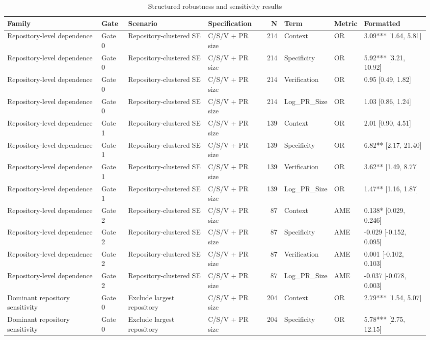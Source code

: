 \begin{table}
\caption{Structured robustness and sensitivity results}
\label{tab:robustness-full}
\begin{tabular}{llllrlll}
\toprule
Family & Gate & Scenario & Specification & N & Term & Metric & Formatted \\
\midrule
Repository-level dependence & Gate 0 & Repository-clustered SE & C/S/V + PR size & 214 & Context & OR & 3.09*** [1.64, 5.81] \\
Repository-level dependence & Gate 0 & Repository-clustered SE & C/S/V + PR size & 214 & Specificity & OR & 5.92*** [3.21, 10.92] \\
Repository-level dependence & Gate 0 & Repository-clustered SE & C/S/V + PR size & 214 & Verification & OR & 0.95 [0.49, 1.82] \\
Repository-level dependence & Gate 0 & Repository-clustered SE & C/S/V + PR size & 214 & Log\_PR\_Size & OR & 1.03 [0.86, 1.24] \\
Repository-level dependence & Gate 1 & Repository-clustered SE & C/S/V + PR size & 139 & Context & OR & 2.01 [0.90, 4.51] \\
Repository-level dependence & Gate 1 & Repository-clustered SE & C/S/V + PR size & 139 & Specificity & OR & 6.82** [2.17, 21.40] \\
Repository-level dependence & Gate 1 & Repository-clustered SE & C/S/V + PR size & 139 & Verification & OR & 3.62** [1.49, 8.77] \\
Repository-level dependence & Gate 1 & Repository-clustered SE & C/S/V + PR size & 139 & Log\_PR\_Size & OR & 1.47** [1.16, 1.87] \\
Repository-level dependence & Gate 2 & Repository-clustered SE & C/S/V + PR size & 87 & Context & AME & 0.138* [0.029, 0.246] \\
Repository-level dependence & Gate 2 & Repository-clustered SE & C/S/V + PR size & 87 & Specificity & AME & -0.029 [-0.152, 0.095] \\
Repository-level dependence & Gate 2 & Repository-clustered SE & C/S/V + PR size & 87 & Verification & AME & 0.001 [-0.102, 0.103] \\
Repository-level dependence & Gate 2 & Repository-clustered SE & C/S/V + PR size & 87 & Log\_PR\_Size & AME & -0.037 [-0.078, 0.003] \\
Dominant repository sensitivity & Gate 0 & Exclude largest repository & C/S/V + PR size & 204 & Context & OR & 2.79*** [1.54, 5.07] \\
Dominant repository sensitivity & Gate 0 & Exclude largest repository & C/S/V + PR size & 204 & Specificity & OR & 5.78*** [2.75, 12.15] \\

\end{tabular}
\end{table}
